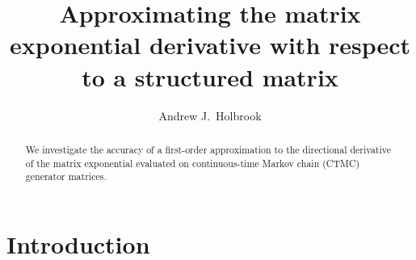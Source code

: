 \documentclass[12pt]{article} %
\title{Approximating the matrix exponential derivative with respect to a structured matrix}
\author{Andrew J.~Holbrook}
\affil{UCLA Biostatistics}
\begin{document}
\maketitle




\begin{abstract}

We investigate the accuracy of a first-order approximation to the directional derivative of the matrix exponential evaluated on continuous-time Markov chain (CTMC) generator matrices.


\end{abstract}



\section{Introduction}\label{sec:intro}


\newcommand{\QQ}{\mathbf{Q}}
\newcommand{\DD}{\mathbf{D}}
\newcommand{\MM}{\mathbf{M}}
\newcommand{\JJ}{\mathbf{J}}
\newcommand{\II}{\mathbf{I}}
\newcommand{\RR}{\mathbf{R}}
\newcommand{\Zero}{\boldsymbol{0}}
\newcommand{\ttheta}{\boldsymbol{\theta}}
\newcommand{\Llambda}{\boldsymbol{\Lambda}}
\newcommand{\vecc}{\mbox{vec}}
\newcommand{\CC}{\mathbf{C}}
\newcommand{\BB}{\mathbf{B}}
\renewcommand{\AA}{\mathbf{A}}
\newcommand{\GG}{\mathbf{G}}
\end{document}
